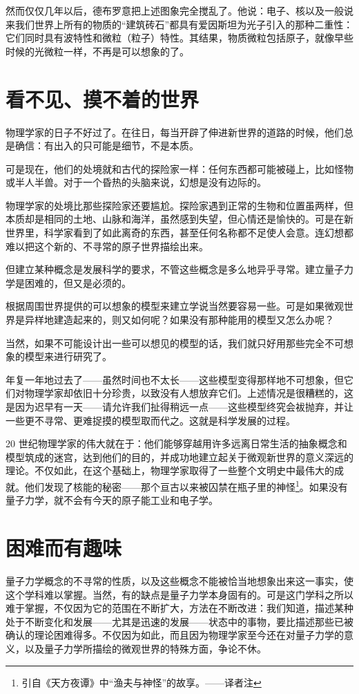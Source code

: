 然而仅仅几年以后，德布罗意把上述图象完全搅乱了。他说：电子、核以及一般说来我们世界上所有的物质的“建筑砖石”都具有爱因斯坦为光子引入的那种二重性：它们同时具有波特性和微粒（粒子）特性。其结果，物质微粒包括原子，就像早些时候的光微粒一样，不再是可以想象的了。

\section{看不见、摸不着的世界}

物理学家的日子不好过了。在往日，每当开辟了伸进新世界的道路的时候，他们总是确信：有出入的只可能是细节，不是本质。

可是现在，他们的处境就和古代的探险家一样：任何东西都可能被碰上，比如怪物或半人半兽。对于一个昏热的头脑来说，幻想是没有边际的。

物理学家的处境比那些探险家还要尴尬。探险家遇到正常的生物和位置虽两样，但本质却是相同的土地、山脉和海洋，虽然感到失望，但心情还是愉快的。可是在新世界里，科学家看到了如此离奇的东西，甚至任何名称都不足使人会意。连幻想都难以把这个新的、不寻常的原子世界描绘出来。

但建立某种概念是发展科学的要求，不管这些概念是多么地异乎寻常。建立量子力学是困难的，但又是必须的。

根据周围世界提供的可以想象的模型来建立学说当然要容易一些。可是如果微观世界是异样地建造起来的，则又如何呢？如果没有那种能用的模型又怎么办呢？

当然，如果不可能设计出一些可以想见的模型的话，我们就只好用那些完全不可想象的模型来进行研究了。

年复一年地过去了——虽然时间也不太长——这些模型变得那样地不可想象，但它们对物理学家却依旧十分珍贵，以致没有人想放弃它们。上述情况是很糟糕的，这是因为迟早有一天——请允许我们扯得稍远一点——这些模型终究会袚抛弃，并让一些更不寻常、更难捉摸的模型取而代之。这就是科学发展的过程。

20 世纪物理学家的伟大就在于：他们能够穿越用许多远离日常生活的抽象概念和模型筑成的迷宫，达到他们的目的，并成功地建立起关于微观新世界的意义深远的理论。不仅如此，在这个基础上，物理学家取得了一些整个文明史中最伟大的成就。他们发现了核能的秘密——那个亘古以来被囚禁在瓶子里的神怪\footnote{引自《天方夜谭》中“渔夫与神怪”的故享。——译者注}。如果没有量子力学，就不会有今天的原子能工业和电子学。

\section{困难而有趣味}

量子力学概念的不寻常的性质，以及这些概念不能被恰当地想象出来这一事实，使这个学科难以掌握。当然，有的缺点是量子力学本身固有的。可是这门学科之所以难于掌握，不仅因为它的范围在不断扩大，方法在不断改进：我们知道，描述某种处于不断变化和发展——尤其是迅速的发展——状态中的事物，要比描述那些已被确认的理论困难得多。不仅因为如此，而且因为物理学家至今还在对量子力学的意义，以及量子力学所描绘的微观世界的特殊方面，争论不休。

